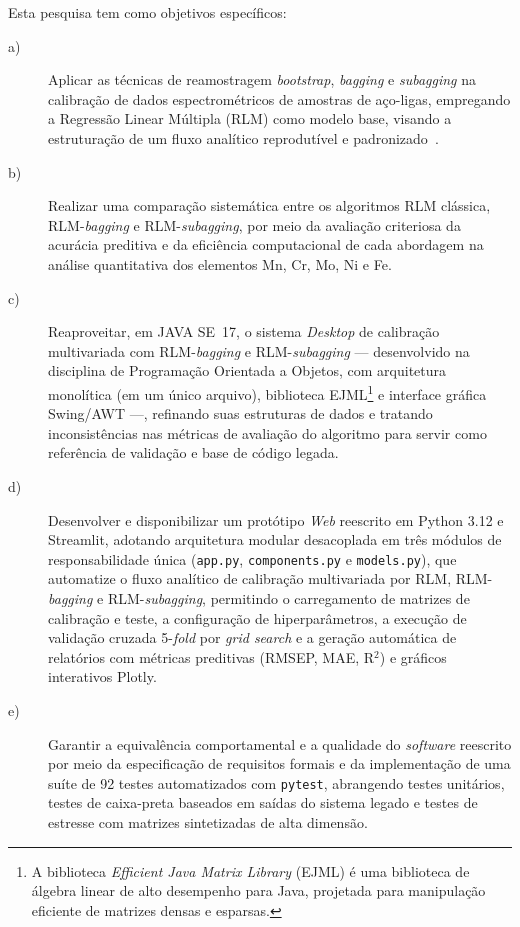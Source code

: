 Esta pesquisa tem como objetivos específicos:
\begin{description}
 \item[a)] Aplicar as técnicas de reamostragem \textit{bootstrap}, \textit{bagging} e \textit{subagging} na calibração de dados espectrométricos de amostras de aço-ligas, empregando a Regressão Linear Múltipla (RLM) como modelo base, visando a estruturação de um fluxo analítico reprodutível e padronizado~\cite{Canty2001,rathnayake2022}.

 \item[b)] Realizar uma comparação sistemática entre os algoritmos RLM clássica, RLM-\textit{bagging} e RLM-\textit{subagging}, por meio da avaliação criteriosa da acurácia preditiva e da eficiência computacional de cada abordagem na análise quantitativa dos elementos Mn, Cr, Mo, Ni e Fe.

 \item[c)] Reaproveitar, em \gls{JAVA SE}~17, o sistema \textit{Desktop} de calibração multivariada com RLM-\textit{bagging} e RLM-\textit{subagging} — desenvolvido na disciplina de Programação Orientada a Objetos, com arquitetura monolítica (em um único arquivo), biblioteca \gls{EJML}\footnote{A biblioteca \textit{Efficient Java Matrix Library} (EJML) é uma biblioteca de álgebra linear de alto desempenho para Java, projetada para manipulação eficiente de matrizes densas e esparsas.} e interface gráfica Swing/\gls{AWT} —, refinando suas estruturas de dados e tratando inconsistências nas métricas de avaliação do algoritmo para servir como referência de validação e base de código legada.

 \item[d)] Desenvolver e disponibilizar um protótipo \textit{Web} reescrito em Python 3.12 e Streamlit, adotando arquitetura modular desacoplada em três módulos de responsabilidade única (\texttt{app.py}, \texttt{components.py} e \texttt{models.py}), que automatize o fluxo analítico de calibração multivariada por RLM, RLM-\textit{bagging} e RLM-\textit{subagging}, permitindo o carregamento de matrizes de calibração e teste, a configuração de hiperparâmetros, a execução de validação cruzada 5-\textit{fold} por \textit{grid search} e a geração automática de relatórios com métricas preditivas (RMSEP, MAE, R$^2$) e gráficos interativos Plotly.

 \item[e)] Garantir a equivalência comportamental e a qualidade do \textit{software} reescrito por meio da especificação de requisitos formais e da implementação de uma suíte de 92 testes automatizados com \texttt{pytest}, abrangendo testes unitários, testes de caixa-preta baseados em saídas do sistema legado e testes de estresse com matrizes sintetizadas de alta dimensão.
\end{description}

